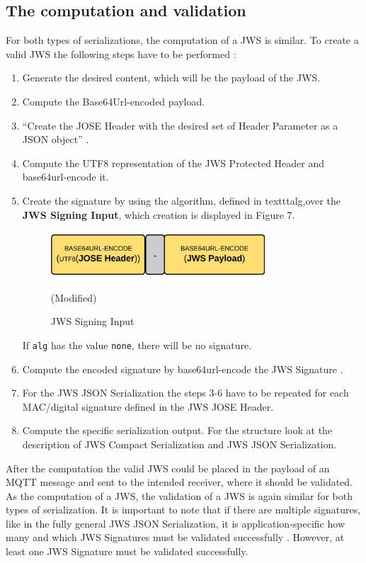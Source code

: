 \subsection{The computation and validation }
For both types of serializations, the computation of a JWS is similar. To create a valid JWS the following steps have to be performed \cite{rfc7515}: 
\begin{enumerate} [leftmargin=1cm,rightmargin=1cm]\itemsep0.2em
\item Generate the desired content, which will be the payload of the JWS.
\item Compute the Base64Url-encoded payload. 
\item ``Create the JOSE Header with the desired set of Header Parameter as a JSON object'' \cite{rfc7515}.
\item Compute the UTF8 representation of the JWS Protected Header and base64url-encode it.
\item Create the signature by using the algorithm, defined in texttt{alg},\newline over the \textbf{JWS Signing Input}, which creation is displayed in Figure 7. 
\begin{figure}
\centering
\includegraphics[width=8cm]{Pages/JWS/SigningInput.png}
\caption{JWS Signing Input}\cite{Compact} (Modified)
\end{figure} If \texttt{alg} has the value \texttt{none}, there will be no signature.
\item Compute the encoded signature by base64url-encode the JWS Signature .
\item For the JWS JSON Serialization the steps 3-6 have to be repeated for each MAC/digital signature defined in the JWS JOSE Header.
\item Compute the specific serialization output. For the structure look at the description of JWS Compact Serialization and JWS JSON Serialization.
\end{enumerate} 
After the computation the valid JWS could be placed in the payload of an MQTT message and sent to the intended receiver, where it should be validated.
As the computation of a JWS, the validation of a JWS is again similar for both types of serialization. It is important to note that if there are multiple signatures, like in the fully general JWS JSON Serialization,  it is application-specific how many and which JWS Signatures must be validated successfully \cite{rfc7515}. However, at least one JWS Signature must be validated successfully.
